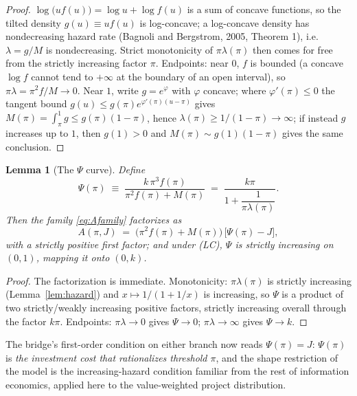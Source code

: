 \documentclass[11pt]{article}
\newtheorem{lemma}{Lemma}
\theoremstyle{definition}
\begin{document}
\begin{proof}
$\log\bigl(uf(u)\bigr)=\log u+\log f(u)$ is a sum of concave functions, so the tilted density $g(u)\equiv uf(u)$ is log-concave; a log-concave density has nondecreasing hazard rate (Bagnoli and Bergstrom, 2005, Theorem 1), i.e.\ $\lambda=g/M$ is nondecreasing. Strict monotonicity of $\pi\lambda(\pi)$ then comes for free from the strictly increasing factor $\pi$. Endpoints: near $0$, $f$ is bounded (a concave $\log f$ cannot tend to $+\infty$ at the boundary of an open interval), so $\pi\lambda=\pi^{2}f/M\to0$. Near $1$, write $g=e^{\varphi}$ with $\varphi$ concave; where $\varphi'(\pi)\le0$ the tangent bound $g(u)\le g(\pi)e^{\varphi'(\pi)(u-\pi)}$ gives $M(\pi)=\int_\pi^1 g\le g(\pi)(1-\pi)$, hence $\lambda(\pi)\ge1/(1-\pi)\to\infty$; if instead $g$ increases up to $1$, then $g(1)>0$ and $M(\pi)\sim g(1)(1-\pi)$ gives the same conclusion.
\end{proof}

\begin{lemma}[The $\Psi$ curve]\label{lem:psi}
Define
\[
\Psi(\pi)\;\equiv\;\frac{k\,\pi^{3}f(\pi)}{\pi^{2}f(\pi)+M(\pi)}
\;=\;\frac{k\pi}{1+\dfrac{1}{\pi\lambda(\pi)}}.
\]
Then the family \eqref{eq:Afamily} factorizes as
\[
A(\pi,J)\;=\;\bigl(\pi^{2}f(\pi)+M(\pi)\bigr)\,\bigl[\Psi(\pi)-J\bigr],
\]
with a strictly positive first factor; and under (LC), $\Psi$ is strictly increasing on $(0,1)$, mapping it onto $(0,k)$.
\end{lemma}

\begin{proof}
The factorization is immediate. Monotonicity: $\pi\lambda(\pi)$ is strictly increasing (Lemma~\ref{lem:hazard}) and $x\mapsto1/(1+1/x)$ is increasing, so $\Psi$ is a product of two strictly/weakly increasing positive factors, strictly increasing overall through the factor $k\pi$. Endpoints: $\pi\lambda\to0$ gives $\Psi\to0$; $\pi\lambda\to\infty$ gives $\Psi\to k$.
\end{proof}

The bridge's first-order condition on either branch now reads $\Psi(\pi)=J$: $\Psi(\pi)$ is \emph{the investment cost that rationalizes threshold $\pi$}, and the shape restriction of the model is the increasing-hazard condition familiar from the rest of information economics, applied here to the value-weighted project distribution.
\end{document}
